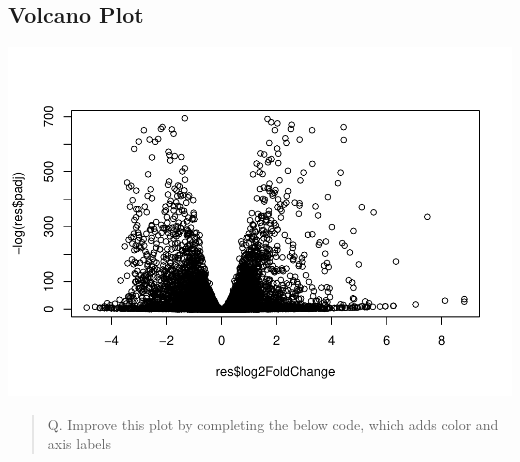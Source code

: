 \documentclass[
]{article}
\newenvironment{Shaded}{\begin{snugshade}}{\end{snugshade}}
\newcommand{\CommentTok}[1]{\textcolor[rgb]{0.56,0.35,0.01}{\textit{#1}}}
\newcommand{\FunctionTok}[1]{\textcolor[rgb]{0.00,0.00,0.00}{#1}}
\newcommand{\NormalTok}[1]{#1}
\newcommand{\SpecialCharTok}[1]{\textcolor[rgb]{0.00,0.00,0.00}{#1}}
\begin{document}
\hypertarget{volcano-plot}{%
\subsection{Volcano Plot}\label{volcano-plot}}

\begin{Shaded}
\end{Shaded}

\includegraphics{lab13_bimm143_files/figure-latex/unnamed-chunk-9-1.pdf}

\begin{quote}
Q. Improve this plot by completing the below code, which adds color and
axis labels
\end{quote}
\end{document}
